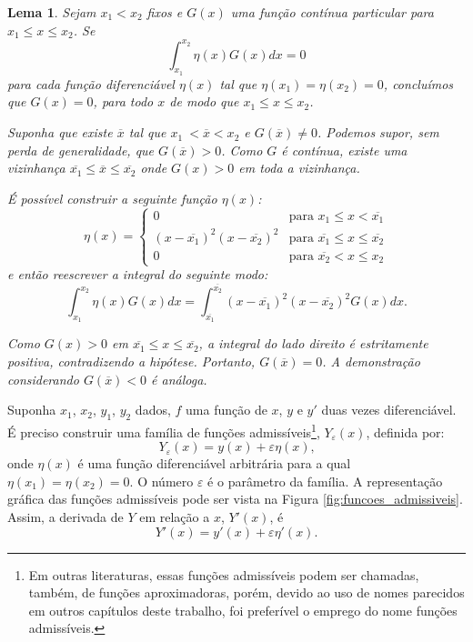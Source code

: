 \documentclass[
	12pt,				%
	openright,			%
    twoside,			%
	a4paper,			%
	english,			%
	french,				%
	spanish,			%
	brazil				%
	]{abntex2}
\makeatletter
\newtheorem{lema}{Lema}
\renewenvironment{proof}[1][\proofname]{
	\par\pushQED{\qed}%
	\normalfont \topsep6\p@\@plus6\p@\relax
	\trivlist
	\item\relax
		{\itshape
			#1\@addpunct{.}}\hspace\labelsep\ignorespaces
}{%
	\popQED\endtrivlist\@endpefalse
}
\numberwithin{lema}{chapter}
\numberwithin{teorema}{chapter}
\numberwithin{definicao}{chapter}
\numberwithin{exemplo}{chapter}
\numberwithin{figure}{chapter}
\makeatother
\begin{document}
\begin{lema}
\label{lema:cap_calcvar_lema_1}
Sejam $x_1 < x_2$ fixos e $G(x)$ uma função contínua particular para $x_1 \leqslant x \leqslant x_2$. Se $$\int_{x_1}^{x_2} \eta (x) G(x) dx = 0$$
para cada função diferenciável $\eta (x)$ tal que $\eta (x_1)=\eta (x_2)=0$, concluímos que $G(x)=0$, para todo $x$ de modo que $x_1 \leqslant x \leqslant x_2$.

\begin{proof}
Suponha que existe $\overline{x}$ tal que $x_1\ < \overline{x} < x_2$ e $G(\overline{x})\neq 0$. Podemos supor, sem perda de generalidade, que $G(\overline{x})>0$. Como $G$ é contínua, existe uma vizinhança $\overline{x_1} \leqslant \overline{x} \leqslant \overline{x_2}$ onde $G(x)>0$ em toda a vizinhança.

É possível construir a seguinte função $\eta (x)$:
$$
\eta (x) = 
	\begin{cases}
		0 											& \mbox{para } x_1 \leqslant x < \overline{x_1}\\
		(x-\overline{x_1})^2(x-\overline{x_2})^2	& \mbox{para } \overline{x_1} \leqslant x \leqslant \overline{x_2}\\
		0											& \mbox{para } \overline{x_2} < x \leqslant x_2
	\end{cases}
$$
e então reescrever a integral do seguinte modo:
$$\int_{x_1}^{x_2}\eta (x) G(x)dx =\int_{\overline{x_1}}^{\overline{x_2}}(x-\overline{x_1})^2(x-\overline{x_2})^2G(x)dx\text{.}$$

Como $G(x) > 0$ em $\overline{x_1} \leqslant x \leqslant \overline{x_2}$, a integral do lado direito é estritamente positiva, contradizendo a hipótese. Portanto, $G(\overline{x})=0$. A demonstração considerando $G(\overline{x})<0$ é análoga.
\end{proof}
\end{lema}

Suponha $x_1$, $x_2$, $y_1$, $y_2$ dados, $f$ uma função de $x$, $y$ e $y'$ duas vezes diferenciável. É preciso construir uma família de funções admissíveis\footnote{Em outras literaturas, essas funções admissíveis podem ser chamadas, também, de funções aproximadoras, porém, devido ao uso de nomes parecidos em outros capítulos deste trabalho, foi preferível o emprego do nome funções admissíveis.}, $Y_{\varepsilon}(x)$, definida por:
\begin{equation}\label{eqn:cap_calc_var:func_admissible}
	Y_{\varepsilon}(x)=y(x)+\varepsilon \eta (x)\text{,}
\end{equation}
onde $\eta (x)$ é uma função diferenciável arbitrária para a qual $\eta (x_1)=\eta (x_2) = 0$. O número $\varepsilon$ é o parâmetro da família. A representação gráfica das funções admissíveis pode ser vista na Figura \ref{fig:funcoes_admissiveis}. Assim, a derivada de $Y$ em relação a $x$, $Y'(x)$, é
\begin{equation}\label{eqn:cap_calc_var:func_admissible_diff}
	Y'(x)=y'(x)+\varepsilon \eta '(x)\text{.}
\end{equation}
\end{document}
